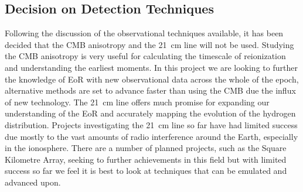 
\subsection{Decision on Detection Techniques} %
\label{sec:decision_on_detection_techniques}
	Following the discussion of the observational techniques available, it has been decided that the CMB anisotropy and the \SI{21}{\centi\metre} line will not be used. Studying the CMB anisotropy is very useful for calculating the timescale of reionization and understanding the earliest moments. In this project we are looking to further the knowledge of EoR with new observational data across the whole of the epoch, alternative methods are set to advance faster than using the CMB due the influx of new technology. The \SI{21}{\centi\metre} line offers much promise for expanding our understanding of the EoR and accurately mapping the evolution of the hydrogen distribution. Projects investigating the \SI{21}{\centi\metre} line so far have had limited success due mostly to the vast amounts of radio interference around the Earth, especially in the ionosphere. There are a number of planned projects, such as the Square Kilometre Array, seeking to further achievements in this field but with limited success so far we feel it is best to look at techniques that can be emulated and advanced upon.

